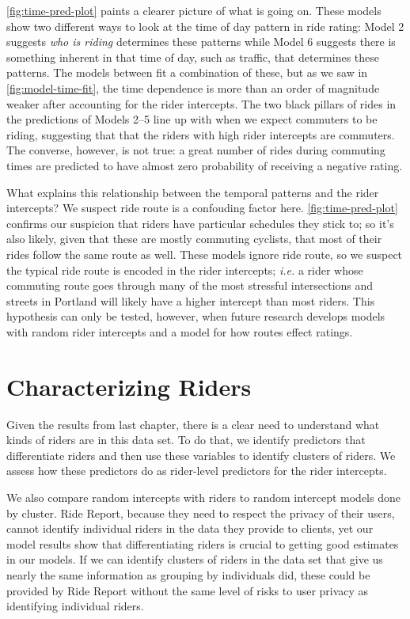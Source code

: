 \documentclass[12pt,twoside]{reedthesis}
\begin{document}
  \autoref{fig:time-pred-plot} paints a clearer picture of what is going
  on. These models show two different ways to look at the time of day
  pattern in ride rating: Model 2 suggests \emph{who is riding} determines
  these patterns while Model 6 suggests there is something inherent in
  that time of day, such as traffic, that determines these patterns. The
  models between fit a combination of these, but as we saw in
  \autoref{fig:model-time-fit}, the time dependence is more than an order
  of magnitude weaker after accounting for the rider intercepts. The two
  black pillars of rides in the predictions of Models 2--5 line up with
  when we expect commuters to be riding, suggesting that that the riders
  with high rider intercepts are commuters. The converse, however, is not
  true: a great number of rides during commuting times are predicted to
  have almost zero probability of receiving a negative rating.
  
  What explains this relationship between the temporal patterns and the
  rider intercepts? We suspect ride route is a confouding factor here.
  \autoref{fig:time-pred-plot} confirms our suspicion that riders have
  particular schedules they stick to; so it's also likely, given that
  these are mostly commuting cyclists, that most of their rides follow the
  same route as well. These models ignore ride route, so we suspect the
  typical ride route is encoded in the rider intercepts; \emph{i.e.} a
  rider whose commuting route goes through many of the most stressful
  intersections and streets in Portland will likely have a higher
  intercept than most riders. This hypothesis can only be tested, however,
  when future research develops models with random rider intercepts and a
  model for how routes effect ratings.
  
  \chapter{Characterizing Riders}\label{characterizing-riders}
  
  Given the results from last chapter, there is a clear need to understand
  what kinds of riders are in this data set. To do that, we identify
  predictors that differentiate riders and then use these variables to
  identify clusters of riders. We assess how these predictors do as
  rider-level predictors for the rider intercepts.
  
  We also compare random intercepts with riders to random intercept models
  done by cluster. Ride Report, because they need to respect the privacy
  of their users, cannot identify individual riders in the data they
  provide to clients, yet our model results show that differentiating
  riders is crucial to getting good estimates in our models. If we can
  identify clusters of riders in the data set that give us nearly the same
  information as grouping by individuals did, these could be provided by
  Ride Report without the same level of risks to user privacy as
  identifying individual riders.
  
\end{document}
